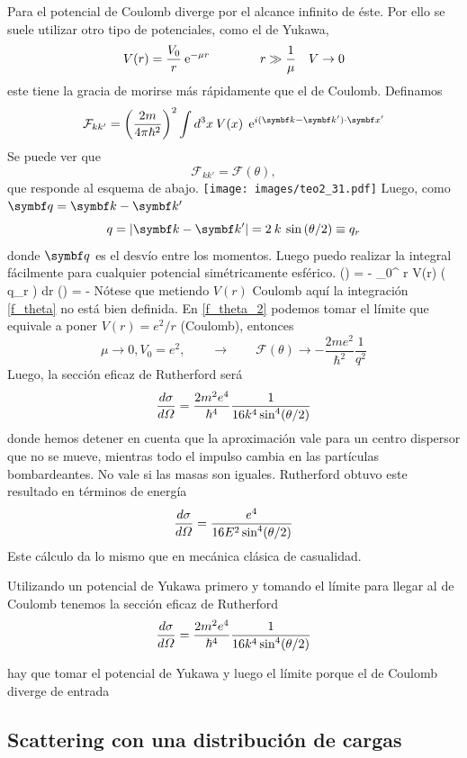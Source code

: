 \documentclass[10pt,oneside]{CBFT_book}
\begin{document}
Para el potencial de Coulomb diverge por el alcance infinito de éste. Por ello se suele utilizar otro tipo de
potenciales, como el de Yukawa,
\[
	V(r) = \frac{V_0}{r} \:\mathrm{e}^{-\mu r} \qquad \qquad r \gg \frac{1}{\mu} \quad V \to 0
\]
este tiene la gracia de morirse más rápidamente que el de Coulomb. Definamos
\[
	\mathcal{F}_{kk'} = \Frac{2m}{4\pi\hbar^2}^2 \int d^3x \: V(x) \: \euler^{i(\vb{k}-\vb{k}')\cdot\vb{x}'}
\]
Se puede ver que 
\[
	\mathcal{F}_{kk'} = \mathcal{F}(\theta),
\]
que responde al esquema de abajo.
\texttt{[image: images/teo2\_31.pdf]}	
Luego, como $\vb q = \vb{k} - \vb{k}'$
\[
	q = | \vb{k} - \vb{k}' | = 2 \: k \: \sin\left( \theta / 2 \right) \equiv q_r
\]
donde $\vb q$ es el desvío entre los momentos. Luego puedo realizar la integral fácilmente para
cualquier potencial simétricamente esférico.
\be
	 (\theta) = -  
	 \int_0^\infty \: r \: V(r) \: \sin( q_r ) \: dr 
	 \label{f_theta}
\ee
\be
	 (\theta) = -  
	 \label{f_theta_2}
\ee
{}
Nótese que metiendo $V(r)$ Coulomb aquí la integración \eqref{f_theta} no está bien definida.
En \eqref{f_theta_2} podemos tomar el límite que equivale a poner $V(r) = e^2/r$ (Coulomb), entonces
\[
	\mu \to 0, V_0 = e^2, \qquad \to \qquad 
	\mathcal{F}(\theta) \to - \frac{2 m e^2 }{ \hbar^2 } \frac{1}{ q^2 }
\]
Luego, la sección eficaz de Rutherford será
\[
	\frac{d^{\hspace{-0.05em}} {\sigma}}{d {\Omega}^{\hspace{-0.05em}}} = \frac{ 2 m^2 e^4 }{ \hbar^4 } \frac{1}{ 16 k^4 \sin^4 (\theta / 2 ) }
\]
donde hemos detener en cuenta que la aproximación vale para un centro dispersor que no se mueve, mientras
todo el impulso cambia en las partículas bombardeantes. No vale si las masas son iguales.
Rutherford obtuvo este resultado en términos de energía
\[
	\frac{d^{\hspace{-0.05em}} {\sigma}}{d {\Omega}^{\hspace{-0.05em}}} =  \frac{ e^4 }{ 16 E^2 \sin^4 (\theta / 2 ) }
\]
Este cálculo da lo mismo que en mecánica clásica de casualidad.

Utilizando un potencial de Yukawa primero y tomando el límite para llegar al de Coulomb tenemos la sección 
eficaz de Rutherford 
\[
	\frac{d^{\hspace{-0.05em}} {\sigma}}{d {\Omega}^{\hspace{-0.05em}}} = \frac{2m^2e^4}{\hbar^4}\frac{1}{16k^4\sin^4(\theta/2)}
\]

hay que tomar el potencial de Yukawa y luego el límite porque el de Coulomb diverge de entrada

\subsection{Scattering con una distribución de cargas}
\end{document}
